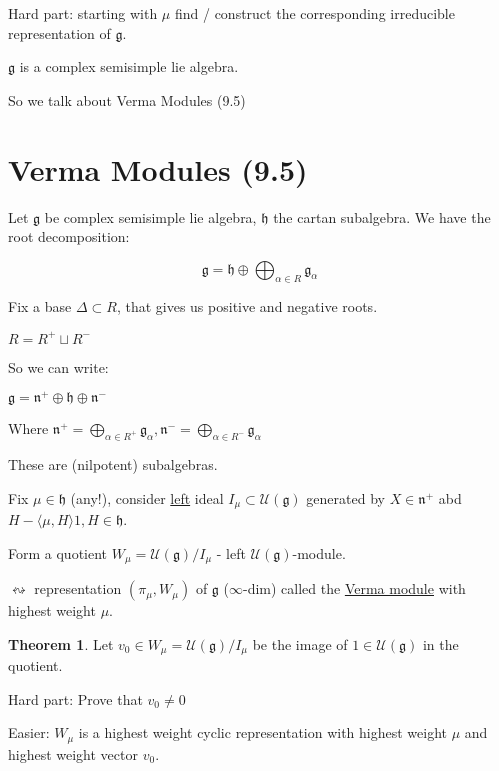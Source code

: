 \documentclass{article}
\theoremstyle{definition}
\newtheorem{theorem}{Theorem}
\begin{document}
Hard part: starting with \(\mu\) find / construct the corresponding irreducible representation of \(\mathfrak{g}\).

\(\mathfrak{g}\) is a complex semisimple lie algebra.

So we talk about Verma Modules (9.5)

\section*{Verma Modules (9.5)}

Let \(\mathfrak{g}\) be complex semisimple lie algebra, \(\mathfrak{h}\) the cartan subalgebra. We have the root decomposition:

\[
    \mathfrak{g} = \mathfrak{h} \oplus \bigoplus_{\alpha \in R} \mathfrak{g}_\alpha
\]

Fix a base \(\Delta \subset R\), that gives us positive and negative roots.

\(R = R^+ \sqcup R^-\) 

So we can write:

\(\mathfrak{g} = \mathfrak{n}^+ \oplus \mathfrak{h} \oplus \mathfrak{n}^-  \) 

Where \(\mathfrak{n}^+ = \bigoplus_{\alpha \in R^+}\mathfrak{g}_\alpha, \mathfrak{n}^- = \bigoplus_{\alpha \in R^-} \mathfrak{g}_\alpha\) 

These are (nilpotent) subalgebras.

Fix \(\mu \in \mathfrak{h}\) (any!), consider \underline{left} ideal \(I_\mu \subset \mathcal{U}(\mathfrak{g})\) generated by \(X\in \mathfrak{n} ^+\) abd \(H - \langle \mu ,H \rangle 1, H\in \mathfrak{h}\).

Form a quotient \(W_\mu = \mathcal{U} (\mathfrak{g}) / I_\mu\) - left \(\mathcal{U} (\mathfrak{g})\)-module.

\(\leftrightsquigarrow\) representation \((\pi_\mu , W_\mu)\) of \(\mathfrak{g}\) (\(\infty\)-dim) called the \underline{Verma module} with highest weight \(\mu\).

\begin{theorem}
    Let \(v_0\in W_\mu = \mathcal{U} (\mathfrak{g}) / I_\mu\) be the image of \(1\in \mathcal{U} (\mathfrak{g})\) in the quotient.
    
    Hard part: Prove that \(v_0\neq 0\)

    Easier: \(W_\mu\) is a highest weight cyclic representation with highest weight \(\mu\) and highest weight vector \(v_0\).  
\end{theorem}
\end{document}
